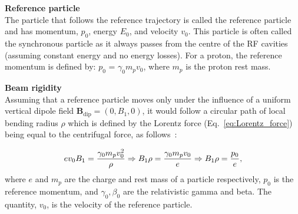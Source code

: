 

\clearpage
\textbf{Reference particle}\\
The particle that follows the reference trajectory is called the reference particle and has momentum, $p_0$, energy $E_0$, and velocity $v_0$.  This particle is often called the synchronous particle as it always passes from the centre of the RF cavities (assuming constant energy and no energy losses). For a proton, the reference momentum is defined by: $p_0$ = $\gamma_0 m_p v_0$, where $m_p$ is the proton rest mass.


\textbf{Beam rigidity}\\
Assuming that a reference particle moves only under the influence of a uniform vertical dipole field $\mathbf{B_\mathrm{dip}}=(0, B_1, 0)$, it would follow a circular path of local bending radius $\rho$ which is defined by the Lorentz force (Eq.~\eqref{eq:Lorentz_force}) being equal to the centrifugal force, as follows~\cite{wolski2014}: %

\begin{equation}\label{eq:Brho}
    e v_0 B_1 = \frac{{\gamma_0} m_p v_0^2}{\rho} \Rightarrow B_1 \rho = \frac{\gamma_0 m_p v_0}{e} \Rightarrow B_1 \rho = \frac{p_0}{e},
\end{equation}
where $e$ and $m_p$ are the charge and rest mass of a particle respectively, $p_0$ is the reference momentum, and $\gamma_0, \beta_0$ are the relativistic gamma and beta. The quantity, $v_0$, is the velocity of the reference particle.


